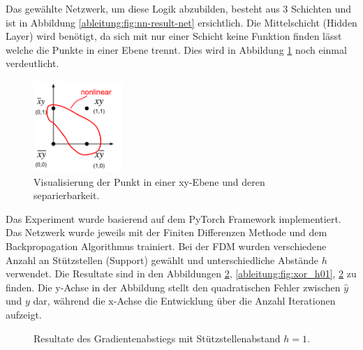 Das gewählte Netzwerk, um diese Logik abzubilden, besteht aus 3 Schichten und ist in Abbildung \ref{ableitung:fig:nn-result-net} ersichtlich. Die Mittelschicht (Hidden Layer) wird benötigt, da sich mit nur einer Schicht keine Funktion finden lässt welche die Punkte in einer Ebene trennt. Dies wird in Abbildung \ref{ableitung:fig:visualisation-surface} noch einmal verdeutlicht.
\begin{figure}
	\centering
	\includegraphics[width=0.3\textwidth]{papers/ableitung/images/xor_surface.png}
	\caption{Visualisierung der Punkt in einer xy-Ebene und deren separierbarkeit.}
	\label{ableitung:fig:visualisation-surface}
\end{figure}
Das Experiment wurde basierend auf dem PyTorch Framework implementiert. Das Netzwerk wurde jeweils mit der Finiten Differenzen Methode und dem Backpropagation Algorithmus trainiert. Bei der FDM wurden verschiedene Anzahl an Stützstellen (Support) gewählt und unterschiedliche Abstände $h$ verwendet. Die Resultate sind in den Abbildungen \ref{ableitung:fig:xor_h1}, \ref{ableitung:fig:xor_h01}, \ref{ableitung:fig:xor_h1} zu finden. Die y-Achse in der Abbildung stellt den quadratischen Fehler zwischen $\hat{y}$ und $y$ dar, während die x-Achse die Entwicklung über die Anzahl Iterationen aufzeigt.

\begin{figure}
	\caption{Resultate des Gradientenabstiegs mit Stützstellenabstand $h=1$.}
	\label{ableitung:fig:xor_h1}
\end{figure}

